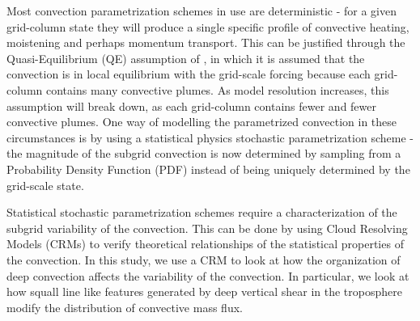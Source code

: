 \documentclass[11pt,a4paper]{article}
\newcommand\todo[1]{\textbf{TODO: #1}}
\begin{document}
Most convection parametrization schemes in use are deterministic - for a given grid-column state they will produce a single specific profile of convective heating, moistening and perhaps momentum transport. This can be justified through the Quasi-Equilibrium (QE) assumption of \cite{arakawa1974interaction}, in which it is assumed that the convection is in local equilibrium with the grid-scale forcing because each grid-column contains many convective plumes. As model resolution increases, this assumption will break down, as each grid-column contains fewer and fewer convective plumes. One way of modelling the parametrized convection in these circumstances is by using a statistical physics stochastic parametrization scheme \parencite{berner2017stochastic} - the magnitude of the subgrid convection is now determined by sampling from a Probability Density Function (PDF) instead of being uniquely determined by the grid-scale state.

Statistical stochastic parametrization schemes require a characterization of the subgrid variability of the convection. This can be done by using Cloud Resolving Models (CRMs) to verify theoretical relationships of the statistical properties of the convection. In this study, we use a CRM to look at how the organization of deep convection affects the variability of the convection. In particular, we look at how squall line like features generated by deep vertical shear in the troposphere modify the distribution of convective mass flux.

\end{document}
